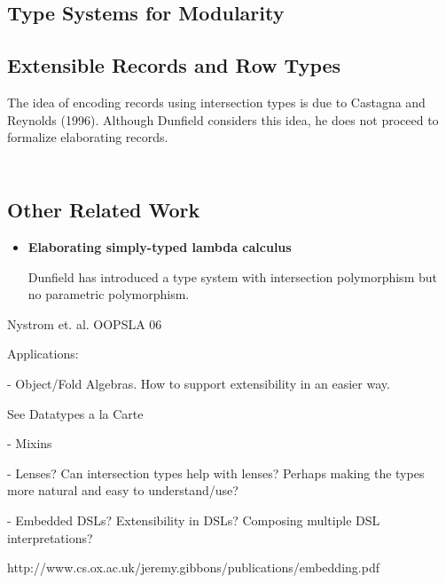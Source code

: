 \subsection{Type Systems for Modularity}

\subsection{Extensible Records and Row Types}

The idea of encoding records using intersection types is due to Castagna and
Reynolds (1996). Although Dunfield considers this idea, he does not proceed to
formalize elaborating records.

\begin{lstlisting}
\end{lstlisting}

\begin{lstlisting}
\end{lstlisting}

\subsection{Other Related Work}

\begin{itemize}

\item{\bf Elaborating simply-typed lambda calculus}

  Dunfield has introduced a type system with intersection polymorphism but no
  parametric polymorphism.

\end{itemize}

Nystrom et. al. OOPSLA 06

Applications:

- Object/Fold Algebras. How to support extensibility in an easier way.

See Datatypes a la Carte

- Mixins

- Lenses? Can intersection types help with lenses? Perhaps making the
types more natural and easy to understand/use?

- Embedded DSLs? Extensibility in DSLs? Composing multiple DSL interpretations?

http://www.cs.ox.ac.uk/jeremy.gibbons/publications/embedding.pdf
